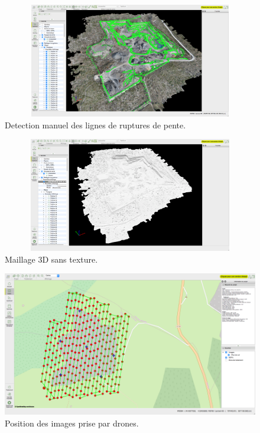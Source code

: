 \begin{figure}[h]
  \begin{center}
    \includegraphics[width=12cm, height=5cm]{images/detctionLigne.jpg}
     \caption{Detection manuel des lignes de ruptures de pente.
     \label{detctionLigne}}
  \end{center}
\end{figure}
\begin{figure}[h]
  \begin{center}
    \includegraphics[width=12cm,height=5cm]{images/maillageSansTexture.jpg}
     \caption{Maillage 3D sans texture.
     \label{maillageSansTexture}}
  \end{center}
\end{figure}
\begin{figure}[h]
  \begin{center}
    \includegraphics[width=12cm]{images/positionImagePix4D.jpg}
     \caption{Position des images prise par drones.
     \label{positionImage}}
  \end{center}
\end{figure}

